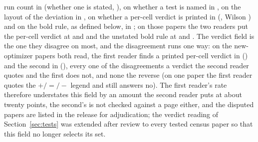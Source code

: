 \documentclass[preprint,review,12pt]{elsarticle}
\begin{document}
run count in \nTaRunsFrac{} (whether one is stated, \nTaRunsStatedFrac{}), on whether a test is named in \nTaTestNamedFrac{}, on the layout of the deviation in \nTaStdLayoutFrac{}, on whether a per-cell verdict is printed in \nTaMarkersFrac{} (\nTaMarkersPct{}, Wilson \nTaMarkersCi{}) and on the bold rule, as defined below, in \nTaBoldRuleFrac{}; on those papers the two readers put the per-cell verdict at \nTaFirstPctMarkers{} and \nTaSecondPctMarkers{} and the unstated bold rule at \nTaFirstPctBoldNotStated{} and \nTaSecondPctBoldNotStated{}. The verdict field is the one they disagree on most, and the disagreement runs one way: on the \nTaMarkersNewOptimizerN{} new-optimizer papers both read, the first reader finds a printed per-cell verdict in \nTaMarkersNewOptimizerFirstYes{} (\nTaMarkersNewOptimizerFirstPct{}) and the second in \nTaMarkersNewOptimizerSecondYes{} (\nTaMarkersNewOptimizerSecondPct{}), every one of the \nTaMarkersNewOptimizerFirstNoSecondYes{} disagreements a verdict the second reader quotes and the first does not, and none the reverse (on one paper the first reader quotes the $+/=/-$ legend and still answers no). The first reader's rate therefore understates this field by an amount the second reader puts at about twenty points, the second's is not checked against a page either, and the disputed papers are listed in the release for adjudication; the verdict reading of Section~\ref{sec:tests} was extended after review to every tested census paper so that this field no longer selects its set.
\end{document}
